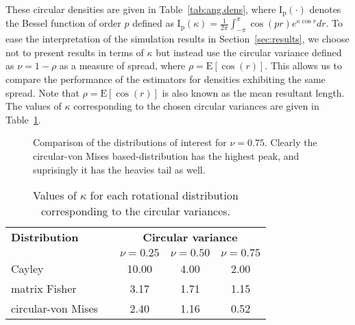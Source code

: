 These circular densities are given in Table~\ref{tab:ang.dens}, where $\mathrm{I_p}(\cdot)$ denotes the Bessel function of order $p$ defined as  $\mathrm{I_p}(\kappa)=\frac{1}{2\pi}\int_{-\pi}^{\pi}\cos(pr)e^{\kappa\cos r}dr$. To ease the interpretation of the simulation results in Section~\ref{sec:results},  we choose not to present results in terms of $\kappa$ but instead use the circular variance defined as $\nu=1-\rho$ as a measure of spread, where $\rho=\mathrm{E}[\cos(r)]$. This allows us to compare the performance of the estimators for densities exhibiting the same spread. Note that $\rho=\mathrm{E}[\cos(r)]$ is also known as the mean resultant length.  The values of $\kappa$ corresponding to the chosen circular variances are given in Table~\ref{tab:kappas}.  \\


\begin{figure}[h!]
\centering
{}
\caption{Comparison of the distributions of interest for $\nu=0.75$.  Clearly the circular-von Mises based-distribution has the highest peak, and suprisingly it has the heavies tail as well.}
\label{fig:Haar}
\end{figure}


\begin{table}[h!]
\begin{center}
\caption{Values of $\kappa$ for each rotational distribution corresponding to the circular variances.  \label{tab:kappas}}\vspace{-0.4cm}
\begin{tabular}{l l ccc}\hline
{\bf Distribution} & & \multicolumn{3}{c}{\bf Circular variance} \\
& & $\nu=0.25$ &$\nu=0.50$ & $\nu=0.75$\\ \hline \hline
Cayley & & 10.00 & 4.00 & 2.00 \\
matrix Fisher & & 3.17 & 1.71 & 1.15\\
circular-von Mises & & 2.40 & 1.16 & 0.52\\ \hline
\end{tabular}
\end{center}
\end{table}


